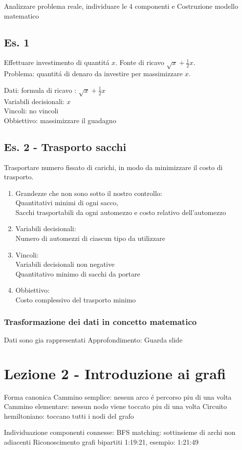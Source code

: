 \documentclass{article}
\begin{document}
Analizzare problema reale, individuare le 4 componenti e Costruzione modello matematico

\subsection{Es. 1}
Effettuare investimento di quantitá $x$. Fonte di ricavo $\sqrt{x} + \frac{1}{2}x$.
\\
Problema: quantitá di denaro da investire per massimizzare $x$.

Dati: formula di ricavo : $\sqrt{x} + \frac{1}{2}x$
\\
Variabili decisionali: $x$
\\
Vincoli: no vincoli
\\
Obbiettivo: massimizzare il guadagno

\subsection{Es. 2 - Trasporto sacchi}
Trasportare numero fissato di carichi, in modo da minimizzare il costo di trasporto.

\begin{enumerate}
    \item Grandezze che non sono sotto il nostro controllo:
        \\
        Quantitativi minimi di ogni sacco,
        \\
        Sacchi trasportabili da ogni automezzo e costo relativo dell'automezzo
    \item Variabili decisionali:
        \\
        Numero di automezzi di ciascun tipo da utilizzare
    \item Vincoli:
        \\
        Variabili decisionali non negative
        \\
        Quantitativo minimo di sacchi da portare
    \item Obbiettivo:
        \\
        Costo complessivo del trasporto minimo
\end{enumerate}
\subsubsection{Trasformazione dei dati in concetto matematico}
Dati sono gia rappresentati
Approfondimento: Guarda slide

\section{Lezione 2 - Introduzione ai grafi}
Forma canonica
Cammino semplice: nessun arco é percorso piu di una volta
Cammino elementare: nessun nodo viene toccato piu di una volta
Circuito hemiltoniano: toccano tutti i nodi del grafo

Individuazione componenti connesse: BFS
matching: sottinsieme di archi non adiacenti
Riconoscimento grafi bipartiti 1:19:21, esempio: 1:21:49
\end{document}
